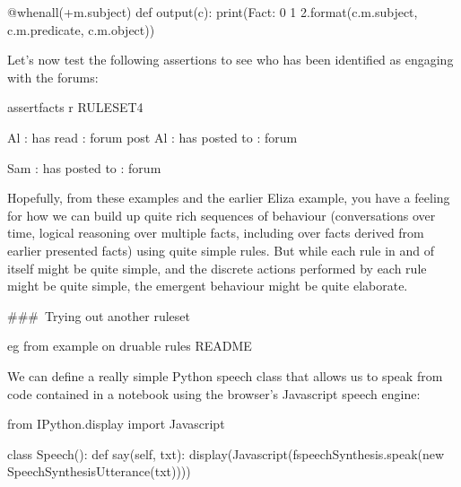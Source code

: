 \documentclass[letterpaper,10pt,english]{sphinxmanual}
\begin{document}
{{\begin{sphinxVerbatim}[commandchars=\\\{\}]
    @when\PYGZus{}all(+m.subject)
    def output(c):
        print(\PYGZsq{}Fact: \PYGZob{}0\PYGZcb{} \PYGZob{}1\PYGZcb{} \PYGZob{}2\PYGZcb{}\PYGZsq{}.format(c.m.subject, c.m.predicate, c.m.object))
\end{sphinxVerbatim}
}

Let’s now test the following assertions to see who has been identified as engaging with the forums:

{
\begin{sphinxVerbatim}[commandchars=\\\{\}]
\llap{\color{nbsphinxin}[ ]:\,\hspace{\fboxrule}\hspace{\fboxsep}}\PYGZpc{}\PYGZpc{}assert\PYGZus{}facts \PYGZhy{}r RULESET\PYGZus{}4

Al : has read : forum post
Al : has posted to : forum

Sam : has posted to : forum
\end{sphinxVerbatim}
}

Hopefully, from these examples and the earlier Eliza example, you have a feeling for how we can build up quite rich sequences of behaviour (conversations over time, logical reasoning over multiple facts, including over facts derived from earlier presented facts) using quite simple rules. But while each rule in and of itself might be quite simple, and the discrete actions performed by each rule might be quite simple, the emergent behaviour might be quite elaborate.

\#\#\# Trying out another ruleset

eg from example on druable rules README

We can define a really simple Python speech class that allows us to speak from code contained in a notebook using the browser’s Javascript speech engine:

{
\begin{sphinxVerbatim}[commandchars=\\\{\}]
\llap{\color{nbsphinxin}[ ]:\,\hspace{\fboxrule}\hspace{\fboxsep}}from IPython.display import Javascript

class Speech():
    def say(self, txt):
        display(Javascript(f\PYGZsq{}speechSynthesis.speak(new SpeechSynthesisUtterance(\PYGZdq{}\PYGZob{}txt\PYGZcb{}\PYGZdq{}))\PYGZsq{}))


\end{sphinxVerbatim}}}
\end{document}
